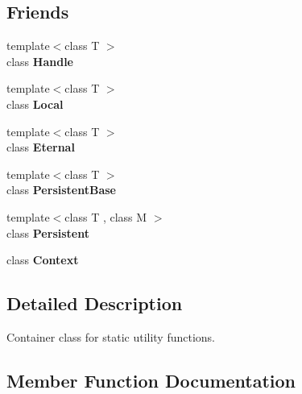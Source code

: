 \subsection*{Friends}
\begin{DoxyCompactItemize}
\item 
\hypertarget{classv8_1_1V8_a67ca1a2d91273eaf85fb3d23ba8ce984}{}{\footnotesize template$<$class T $>$ }\\class {\bfseries Handle}\label{classv8_1_1V8_a67ca1a2d91273eaf85fb3d23ba8ce984}

\item 
\hypertarget{classv8_1_1V8_afb872edb4aac7ba55f0da004113aa2b0}{}{\footnotesize template$<$class T $>$ }\\class {\bfseries Local}\label{classv8_1_1V8_afb872edb4aac7ba55f0da004113aa2b0}

\item 
\hypertarget{classv8_1_1V8_adf5d8780aceb9310fb1246aae7ec348e}{}{\footnotesize template$<$class T $>$ }\\class {\bfseries Eternal}\label{classv8_1_1V8_adf5d8780aceb9310fb1246aae7ec348e}

\item 
\hypertarget{classv8_1_1V8_abb172e0bb22fc5fed7a3a66f29d046ce}{}{\footnotesize template$<$class T $>$ }\\class {\bfseries Persistent\+Base}\label{classv8_1_1V8_abb172e0bb22fc5fed7a3a66f29d046ce}

\item 
\hypertarget{classv8_1_1V8_ad845ec8872174be0a9ca9a3dd1898d30}{}{\footnotesize template$<$class T , class M $>$ }\\class {\bfseries Persistent}\label{classv8_1_1V8_ad845ec8872174be0a9ca9a3dd1898d30}

\item 
\hypertarget{classv8_1_1V8_ac26c806e60ca4a0547680edb68f6e39b}{}class {\bfseries Context}\label{classv8_1_1V8_ac26c806e60ca4a0547680edb68f6e39b}

\end{DoxyCompactItemize}


\subsection{Detailed Description}
Container class for static utility functions. 

\subsection{Member Function Documentation}
\hypertarget{classv8_1_1V8_a37aadf3536c772eb5bbf67fa7822679a}{}
